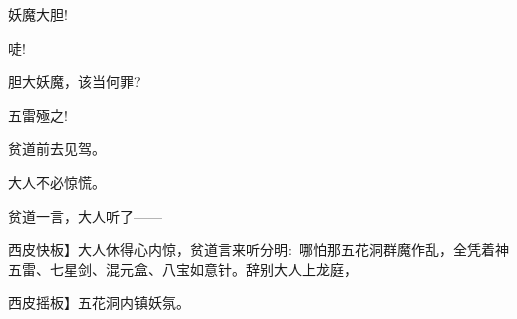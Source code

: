 {{妖魔大胆!}


\vspace{5pt}

{唗!}

{胆大妖魔，该当何罪?}

{五雷殛之!}

{贫道前去见驾。}

{大人不必惊慌。}

{贫道一言，大人听了------}

西皮快板{】大人休得心内惊，贫道言来听分明:~哪怕那五花洞群魔作乱，全凭着神五雷、七星剑、混元盒、八宝如意针。辞别大人上龙庭，}

西皮摇板{】五花洞内镇妖氛。}

}
